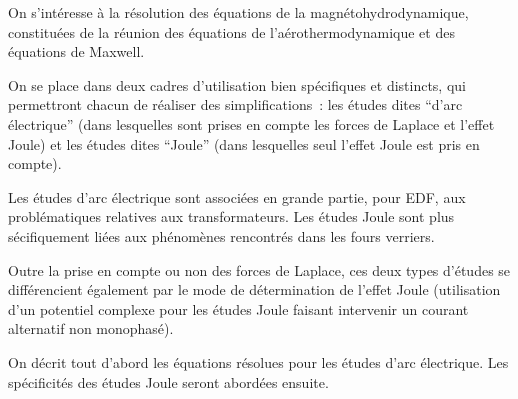 
%
%
%
%


\label{ap:elbase}

\hypertarget{electric}{}

\vspace{0,5cm}
On s'int\'eresse \`a la r\'esolution des \'equations de la
magn\'etohydrodynamique, constitu\'ees de la r\'eunion des \'equations de
l'a\'erothermodynamique et des \'equations de Maxwell.

On se place dans deux cadres d'utilisation bien sp\'ecifiques et distincts,
qui permettront chacun de r\'ealiser des simplifications~: les \'etudes dites
``d'arc
\'electrique'' (dans lesquelles sont prises en compte les forces de Laplace et
l'effet Joule) et les \'etudes dites ``Joule'' (dans lesquelles seul
l'effet Joule est pris en compte).

Les \'etudes d'arc \'electrique sont associ\'ees en grande partie, pour EDF, aux
probl\'ematiques relatives aux transformateurs. Les \'etudes Joule sont plus
s\'ecifiquement li\'ees aux ph\'enom\`enes rencontr\'es dans les fours verriers.

Outre la prise en compte ou non des forces de Laplace, ces deux types d'\'etudes
se diff\'erencient \'egalement par le mode de d\'etermination de l'effet Joule
(utilisation d'un potentiel complexe pour les \'etudes Joule faisant intervenir
un courant alternatif non monophas\'e).

On d\'ecrit tout d'abord les \'equations r\'esolues pour les \'etudes d'arc
\'electrique. Les sp\'ecificit\'es des \'etudes Joule seront abord\'ees ensuite.


